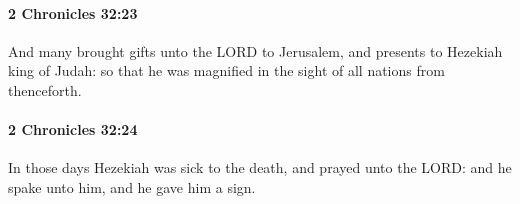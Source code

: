 		\paragraph{2 Chronicles 32:23} %
			\label{2CHRONICLES-32-23}

			And many brought gifts unto the LORD to Jerusalem, and presents to Hezekiah king of Judah: so that he was magnified in the sight of all nations from thenceforth.


		\paragraph{2 Chronicles 32:24} %
			\label{2CHRONICLES-32-24}

			In those days Hezekiah was sick to the death, and prayed unto the LORD: and he spake unto him, and he gave him a sign.


